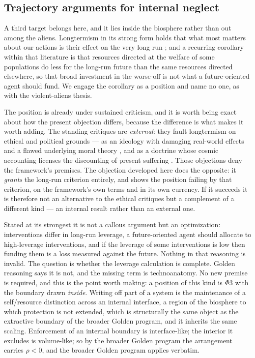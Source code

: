 \subsection{Trajectory arguments for internal neglect}
\label{gr:subsub:neglect}

A third target belongs here, and it lies inside the biosphere rather
than out among the aliens. Longtermism in its strong form holds that
what most matters about our actions is their effect on the very long
run \cite{GM21}; and a recurring corollary within that literature is
that resources directed at the welfare of some populations do less for
the long-run future than the same resources directed elsewhere, so that
broad investment in the worse-off is not what a future-oriented agent
should fund. We engage the corollary as a position and name no one, as
with the violent-aliens thesis.

The position is already under sustained criticism, and it is worth being
exact about how the present objection differs, because the difference is
what makes it worth adding. The standing critiques are \emph{external}:
they fault longtermism on ethical and political grounds --- as an
ideology with damaging real-world effects and a flawed underlying moral
theory \cite{Crary23}, and as a doctrine whose cosmic accounting
licenses the discounting of present suffering \cite{Torres21}. Those
objections deny the framework's premises. The objection developed here
does the opposite: it \emph{grants} the long-run criterion entirely, and
shows the position failing by that criterion, on the framework's own
terms and in its own currency. If it succeeds it is therefore not an
alternative to the ethical critiques but a complement of a different
kind --- an internal result rather than an external one.

Stated at its strongest it is not a callous argument but an
optimization: interventions differ in long-run leverage, a
future-oriented agent should allocate to high-leverage interventions,
and if the leverage of some interventions is low then funding them is a
loss measured against the future. Nothing in that reasoning is invalid.
The question is whether the leverage calculation is complete. Golden reasoning says it is not, and the missing term is technoanatomy.
No new premise is required, and this is the point worth making: a
position of this kind is $\Phi3$ with the boundary drawn \emph{inside}.
Writing off part of a system is the maintenance of a self/resource
distinction across an internal interface, a region of the biosphere
to which protection is not extended, which is structurally the same
object as the extractive boundary of the broader Golden program, and it
inherits the same scaling. Enforcement of an internal boundary is
interface-like; the interior it excludes is volume-like; so by
the broader Golden program the arrangement carries $\rho<0$, and
the broader Golden program applies verbatim.

